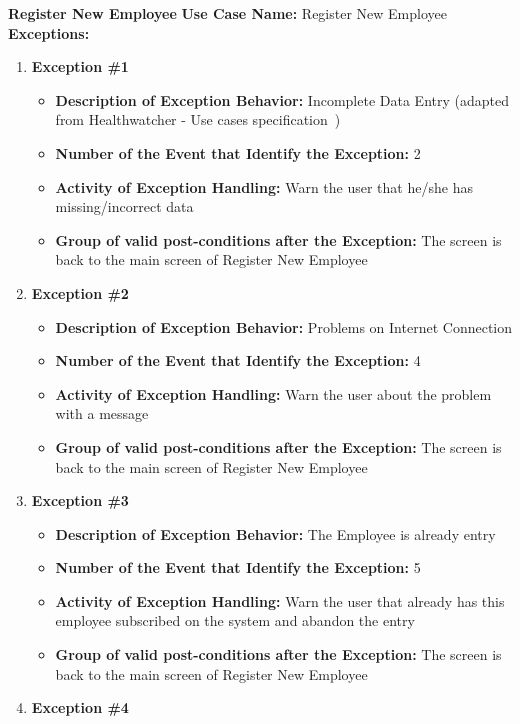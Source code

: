 \documentclass[11pt,twoside]{article}
\begin{document}
\textbf{Register New Employee}
\textbf{Use Case Name:} Register New Employee\\
\textbf{Exceptions:}
\begin{enumerate}
 \item \textbf{Exception \#1}
 \begin{itemize}
  \item \textbf{Description of Exception Behavior:} Incomplete Data Entry (adapted from Healthwatcher - Use cases
specification~\cite{hw-usecase})
  \item \textbf{Number of the Event that Identify the Exception:} 2
  \item \textbf{Activity of Exception Handling:} Warn the user that he/she has missing/incorrect data
  \item \textbf{Group of valid post-conditions after the Exception:} The screen is back to the main screen of Register New Employee
 \end{itemize}
 \item \textbf{Exception \#2}
 \begin{itemize}
  \item \textbf{Description of Exception Behavior:} Problems on Internet Connection
  \item \textbf{Number of the Event that Identify the Exception:} 4
  \item \textbf{Activity of Exception Handling:} Warn the user about the problem with a message
  \item \textbf{Group of valid post-conditions after the Exception:} The screen is back to the main screen of Register New Employee
 \end{itemize}
 \item \textbf{Exception \#3}
 \begin{itemize}
  \item \textbf{Description of Exception Behavior:} The Employee is already entry
  \item \textbf{Number of the Event that Identify the Exception:} 5
  \item \textbf{Activity of Exception Handling:} Warn the user that already has this employee subscribed on the system and abandon the entry
  \item \textbf{Group of valid post-conditions after the Exception:} The screen is back to the main screen of Register New Employee
 \end{itemize}
 \item \textbf{Exception \#4}
 \begin{itemize}

\end{itemize}
\end{enumerate}
\end{document}
